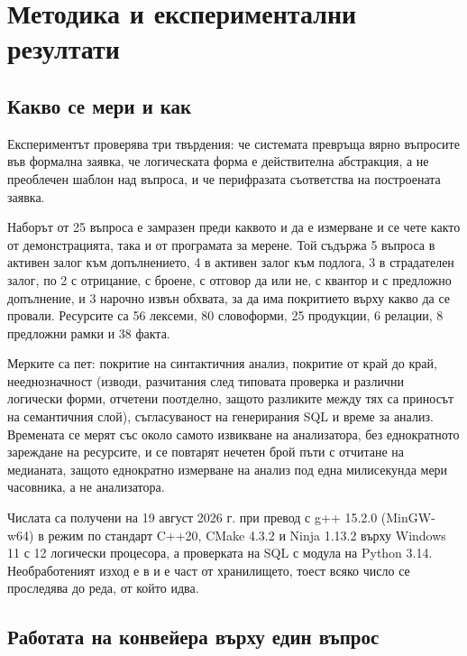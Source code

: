 \section{Методика и експериментални резултати}
\label{sec:results}

\subsection{Какво се мери и как}

Експериментът проверява три твърдения: че системата превръща вярно въпросите във формална
заявка, че логическата форма е действителна абстракция, а не преоблечен шаблон над
въпроса, и че перифразата съответства на построената заявка.

Наборът от 25 въпроса е замразен преди каквото и да е измерване и се чете както от
демонстрацията, така и от програмата за мерене. Той съдържа 5 въпроса в активен залог към
допълнението, 4 в активен залог към подлога, 3 в страдателен залог, по 2 с отрицание, с
броене, с отговор да или не, с квантор и с предложно допълнение, и 3 нарочно извън обхвата,
за да има покритието върху какво да се провали. Ресурсите са 56 лексеми, 80 словоформи, 25
продукции, 6 релации, 8 предложни рамки и 38 факта.

Мерките са пет: покритие на синтактичния анализ, покритие от край до край, нееднозначност
(изводи, разчитания след типовата проверка и различни логически форми, отчетени поотделно,
защото разликите между тях са приносът на семантичния слой), съгласуваност на генерирания
SQL и време за анализ. Времената се мерят със  около
самото извикване на анализатора, без еднократното зареждане на ресурсите, и се повтарят
нечетен брой пъти с отчитане на медианата, защото еднократно измерване на анализ под една
милисекунда мери часовника, а не анализатора.

Числата са получени на 19 август 2026 г. при превод с g++ 15.2.0 (MinGW-w64) в режим
 по стандарт C++20, CMake 4.3.2 и Ninja 1.13.2 върху Windows 11 с 12
логически процесора, а проверката на SQL с модула  на Python 3.14.
Необработеният изход е в  и е част от хранилището, тоест всяко
число се проследява до реда, от който идва.

\subsection{Работата на конвейера върху един въпрос}

